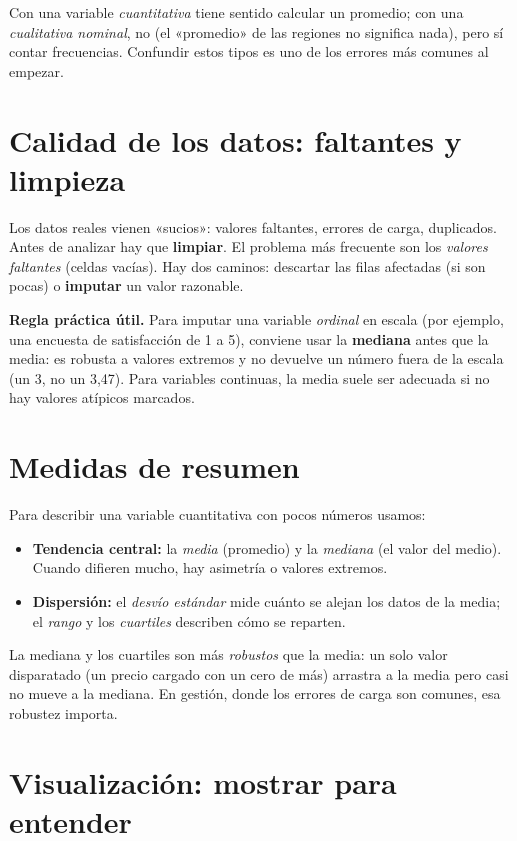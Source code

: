 Con una variable \emph{cuantitativa} tiene sentido calcular un promedio; con una \emph{cualitativa nominal}, no (el «promedio» de las regiones no significa nada), pero sí contar frecuencias. Confundir estos tipos es uno de los errores más comunes al empezar.

\section{Calidad de los datos: faltantes y limpieza}

Los datos reales vienen «sucios»: valores faltantes, errores de carga, duplicados. Antes de analizar hay que \textbf{limpiar}. El problema más frecuente son los \emph{valores faltantes} (celdas vacías). Hay dos caminos: descartar las filas afectadas (si son pocas) o \textbf{imputar} un valor razonable.

\begin{ideabox}
\textbf{Regla práctica útil.} Para imputar una variable \emph{ordinal} en escala (por ejemplo, una encuesta de satisfacción de 1 a 5), conviene usar la \textbf{mediana} antes que la media: es robusta a valores extremos y no devuelve un número fuera de la escala (un 3, no un 3{,}47). Para variables continuas, la media suele ser adecuada si no hay valores atípicos marcados.
\end{ideabox}

\section{Medidas de resumen}

Para describir una variable cuantitativa con pocos números usamos:
\begin{itemize}
  \item \textbf{Tendencia central:} la \emph{media} (promedio) y la \emph{mediana} (el valor del medio). Cuando difieren mucho, hay asimetría o valores extremos.
  \item \textbf{Dispersión:} el \emph{desvío estándar} mide cuánto se alejan los datos de la media; el \emph{rango} y los \emph{cuartiles} describen cómo se reparten.
\end{itemize}
La mediana y los cuartiles son más \emph{robustos} que la media: un solo valor disparatado (un precio cargado con un cero de más) arrastra a la media pero casi no mueve a la mediana. En gestión, donde los errores de carga son comunes, esa robustez importa.

\section{Visualización: mostrar para entender}

